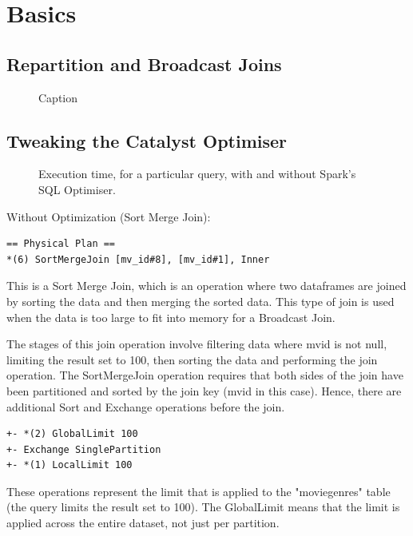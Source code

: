 \documentclass[12pt,twoside]{article}
\begin{document}
\section{Basics}

\subsection{Repartition and Broadcast Joins}

\begin{figure}[htb]
    \centering
    
    \caption{Caption}
    \label{fig:enter-label}
\end{figure}

\subsection{Tweaking the Catalyst Optimiser}

\begin{figure}[htb]
    \centering
    
    \caption{Execution time, for a particular query, with and without Spark's SQL Optimiser.}
    \label{fig:enter-label1}
\end{figure}

Without Optimization (Sort Merge Join):

\begin{verbatim}
== Physical Plan ==
*(6) SortMergeJoin [mv_id#8], [mv_id#1], Inner
\end{verbatim}

\noindent This is a Sort Merge Join, which is an operation where two dataframes are joined by sorting the data and then merging the sorted data. This type of join is used when the data is too large to fit into memory for a Broadcast Join.

The stages of this join operation involve filtering data where mv\textunderscore id is not null, limiting the result set to 100, then sorting the data and performing the join operation. The SortMergeJoin operation requires that both sides of the join have been partitioned and sorted by the join key (mv\textunderscore id in this case). Hence, there are additional Sort and Exchange operations before the join.

\begin{verbatim}
+- *(2) GlobalLimit 100
+- Exchange SinglePartition
+- *(1) LocalLimit 100
\end{verbatim}

\noindent These operations represent the limit that is applied to the "movie\textunderscore genres" table (the query limits the result set to 100). The GlobalLimit means that the limit is applied across the entire dataset, not just per partition.
\end{document}
